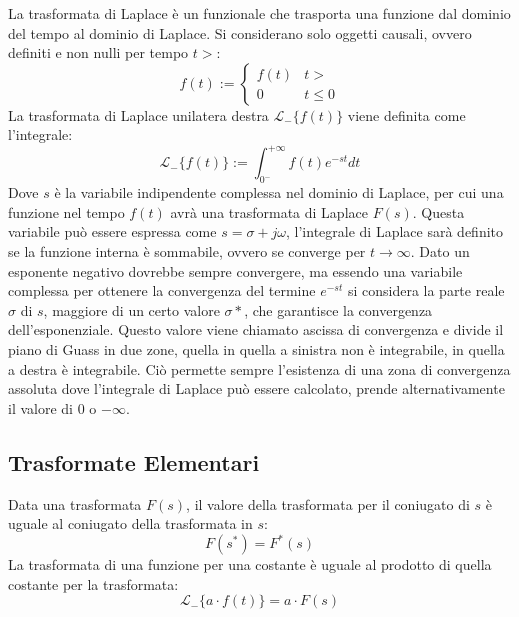 \documentclass{article}
\numberwithin{equation}{subsection}
\begin{document}
La trasformata di Laplace è un funzionale che trasporta una funzione dal dominio del tempo al dominio di Laplace. Si considerano solo oggetti 
causali, ovvero definiti e non nulli per tempo $t>$:
\begin{equation}
    f(t):=
    \begin{cases}
        f(t) &t>\\
        0 &t\leq0
    \end{cases}
\end{equation}    
La trasformata di Laplace unilatera destra $\mathscr{L}_-\{f(t)\}$ viene definita come l'integrale: 
\begin{equation}
    \mathscr{L}_-\{f(t)\}:=\displaystyle\int_{0^-}^{+\infty}f(t)e^{-st}dt
\end{equation}
Dove $s$ è la variabile indipendente complessa nel dominio di Laplace, per cui una funzione nel tempo $f(t)$ avrà una trasformata di Laplace $F(s)$. 
Questa variabile può essere espressa come $s=\sigma+j\omega$, l'integrale di Laplace sarà definito se la funzione interna è sommabile, ovvero se converge per $t\to\infty$. 
Dato un esponente negativo dovrebbe sempre convergere, ma essendo una variabile complessa per ottenere la convergenza del termine $e^{-st}$ si considera la parte reale $\sigma$
di $s$, maggiore di un certo valore $\sigma*$, che garantisce la convergenza dell'esponenziale. Questo valore viene chiamato ascissa di convergenza e divide il piano di Guass 
in due zone, quella in quella a sinistra non è integrabile, in quella a destra è integrabile. Ciò permette sempre l'esistenza di una zona di convergenza assoluta dove l'integrale 
di Laplace può essere calcolato, prende alternativamente il valore di $0$ o $-\infty$. 

\begin{center}
\end{center}

\subsection{Trasformate Elementari}

Data una trasformata $F(s)$, il valore della trasformata per il coniugato di $s$ è uguale al coniugato della trasformata in $s$:
\begin{equation}
    F(s^*)=F^*(s)
\end{equation}
La trasformata di una funzione per una costante è uguale al prodotto di quella costante per la trasformata:
\begin{equation}
    \mathscr{L}_-\{a\cdot f(t)\}=a\cdot F(s)
\end{equation} 
\end{document}
